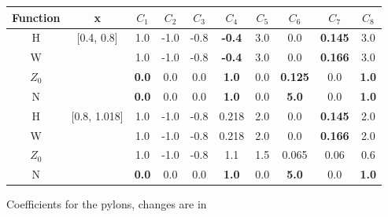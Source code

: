 \documentclass[12pt]{article}
\begin{document}
\begin{figure}[ht]
\begin{centering}
\begin{small}
\begin{tabular}{cccccccccc}
Function & x & $C_{1}$ & $C_{2}$ & $C_{3}$ & $C_{4}$ & $C_{5}$ & $C_{6}$ & $C_{7}$ & $C_{8}$ \\
\hline
H          & [0.4, 0.8]  & 1.0             & -1.0 & -0.8 & \textbf{-0.4} & 3.0 & 0.0                  & \textbf{0.145} & 3.0 \\
W          &                 & 1.0             & -1.0 & -0.8 & \textbf{-0.4} & 3.0 & 0.0                  & \textbf{0.166} & 3.0 \\
$Z_{0}$ &                 & \textbf{0.0} & 0.0  & 0.0  & \textbf{1.0}  & 0.0  & \textbf{0.125} & 0.0                 & \textbf{1.0} \\
N           &                 & \textbf{0.0} & 0.0  & 0.0  & \textbf{1.0}  & 0.0  & \textbf{5.0}     & 0.0                 & \textbf{1.0} \\
\hline
H          & [0.8, 1.018]  & 1.0             & -1.0 & -0.8 & 0.218         & 2.0 & 0.0                 & \textbf{0.145} & 2.0 \\
W          &                     & 1.0             & -1.0 & -0.8 & 0.218         & 2.0 & 0.0                 & \textbf{0.166} & 2.0 \\
$Z_{0}$ &                     & 1.0             & -1.0 & -0.8 & 1.1             & 1.5 & 0.065             & 0.06               & 0.6 \\
N           &                     & \textbf{0.0} & 0.0  & 0.0  & \textbf{1.0} & 0.0 & \textbf{5.0}     & 0.0                 & \textbf{1.0} \\
\end{tabular}
\caption{Coefficients for the pylons, changes are in }
\label{pycoeff}
\end{small}
\end{centering}\end{figure}%
\end{document}
